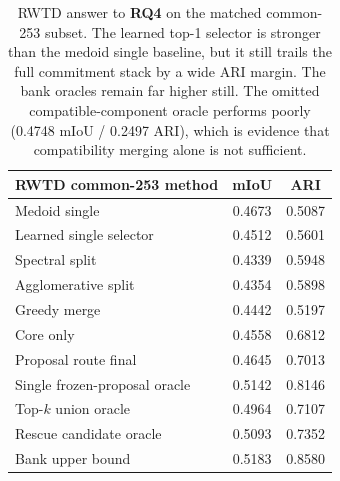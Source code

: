 \begin{table}[t]
\centering
\scriptsize
\begin{tabular}{@{}lcc@{}}
\toprule
RWTD common-253 method & mIoU & ARI \\
\midrule
Medoid single & 0.4673 & 0.5087 \\
Learned single selector & 0.4512 & 0.5601 \\
Spectral split & 0.4339 & 0.5948 \\
Agglomerative split & 0.4354 & 0.5898 \\
Greedy merge & 0.4442 & 0.5197 \\
Core only & 0.4558 & 0.6812 \\
Proposal route final & 0.4645 & 0.7013 \\
Single frozen-proposal oracle & 0.5142 & 0.8146 \\
Top-$k$ union oracle & 0.4964 & 0.7107 \\
Rescue candidate oracle & 0.5093 & 0.7352 \\
Bank upper bound & 0.5183 & 0.8580 \\
\bottomrule
\end{tabular}
\caption{RWTD answer to \textbf{RQ4} on the matched common-253 subset. The learned top-1 selector is stronger than the medoid single baseline, but it still trails the full commitment stack by a wide ARI margin. The bank oracles remain far higher still. The omitted compatible-component oracle performs poorly (0.4748 mIoU / 0.2497 ARI), which is evidence that compatibility merging alone is not sufficient.}
\label{tab:oracle_recoverability}
\end{table}
